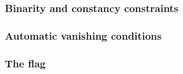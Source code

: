 \subsubsection{Binarity and constancy constraints}    \label{hub: generalities: exceptions: binarity and constancy}     
\subsubsection{Automatic vanishing conditions}        \label{hub: generalities: exceptions: automatic vanishing}        
\subsubsection{The \XAHOY{} flag}                     \label{hub: generalities: exceptions: xAhoy}                      
